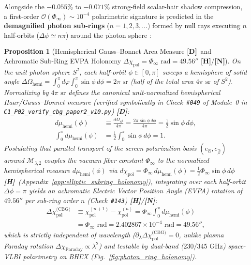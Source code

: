 \documentclass[11pt,a4paper]{article}
\newcommand{\catD}{\textbf{\textcolor{blue!75!black}{[D]}}}
\newcommand{\catH}{\textbf{\textcolor{orange!85!black}{[H]}}}
\newcommand{\catN}{\textbf{\textcolor{teal!75!black}{[N]}}}
\theoremstyle{plain}
\newtheorem{proposition}[theorem]{Proposition}
\theoremstyle{definition}
\theoremstyle{remark}
\numberwithin{equation}{section}
\begin{document}
Alongside the $-0.055\%$ to $-0.071\%$ strong-field scalar-hair shadow compression, a first-order $\mathcal{O}(\Phi_{\infty}) \sim 10^{-4}$ polarimetric signature is predicted in the \textbf{demagnified photon sub-rings} ($n = 1, 2, 3, \dots$) formed by null rays executing $n$ half-orbits ($\Delta\phi \simeq n\pi$) around the photon sphere \cite{johnson2020,bhex2024,walker1970,himwich2020}:

\begin{proposition}[Hemispherical Gauss--Bonnet Area Measure \catD\ and Achromatic Sub-Ring EVPA Holonomy $\Delta\chi_{\text{pol}} = \Phi_{\infty}\text{ rad} = 49.56''$ \catH/\catN]
\label{prop:subring_evpa_holonomy}
On the unit photon sphere $S^2$, each half-orbit $\phi \in [0, \pi]$ sweeps a hemisphere of solid angle $\Delta\Omega_{\text{hemi}} = \int_0^{\pi}d\varphi\int_0^{\pi}\sin\phi\,d\phi = 2\pi\text{ sr}$ (half of the total area $4\pi\text{ sr}$ of $S^2$). Normalizing by $4\pi\text{ sr}$ defines the canonical unit-normalized hemispherical Haar/Gauss--Bonnet measure (verified symbolically in Check~\texttt{\#049} of Module~0 in \allowbreak\texttt{C1\_P02\_verify\_cbg\_paper2\_v10.py}) \catD:
\begin{align}
  d\mu_{\text{hemi}}(\phi) &\equiv \frac{d\Omega_{S^2}}{4\pi} = \frac{2\pi\sin\phi\,d\phi}{4\pi} = \frac{1}{2}\sin\phi\,d\phi, \nonumber \\[3pt]
  \int_0^{\pi} d\mu_{\text{hemi}}(\phi) &= \frac{1}{2}\int_0^{\pi}\sin\phi\,d\phi = 1.
  \label{eq:exact_hemispherical_measure}
\end{align}
Postulating that parallel transport of the screen polarization basis $(e_{\hat{\alpha}}, e_{\hat{\beta}})$ around $\mathcal{M}_{3,2}$ couples the vacuum fiber constant $\Phi_{\infty}$ to the normalized hemispherical measure $d\mu_{\text{hemi}}(\phi)$ via $d\chi_{\text{pol}} = \Phi_{\infty}\,d\mu_{\text{hemi}}(\phi) = \frac{1}{2}\Phi_{\infty}\sin\phi\,d\phi$ \catH\ (Appendix~\ref{app:elliptic_subring_holonomy}), integrating over each half-orbit $\Delta\phi = \pi$ yields an achromatic Electric Vector Position Angle (EVPA) rotation of $\mathbf{49.56''}$ per sub-ring order $n$ (Check~\texttt{\#143}) \catH/\catN:
\begin{align}
\Delta \chi_{\text{pol}}^{\text{(CBG)}} &\equiv \chi_{\text{pol}}^{(n+1)} - \chi_{\text{pol}}^{(n)} = \Phi_{\infty}\int_0^\pi d\mu_{\text{hemi}}(\phi) \nonumber \\[3pt]
&= \Phi_{\infty}\text{ rad} = 2.402867 \times 10^{-4}\text{ rad} = \mathbf{49.56''},
\label{eq:evpa_arcseconds}
\end{align}
which is strictly independent of wavelength ($\partial_\lambda \Delta\chi_{\text{pol}}^{\text{(CBG)}} = 0$, unlike plasma Faraday rotation $\Delta\chi_{\text{Faraday}} \propto \lambda^2$) and testable by dual-band ($230 / 345\text{ GHz}$) space-VLBI polarimetry on BHEX \cite{bhex2024} (Fig.~\ref{fig:photon_ring_holonomy}).
\end{proposition}
\end{document}
